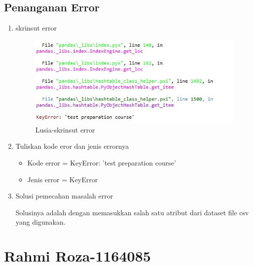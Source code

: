 \subsection{Penanganan Error}
\begin{enumerate}
	\item skrinsut error
		\begin{figure}[ht]
		\centering
		\includegraphics[scale=0.5]{figures/o1.jpg}
		\caption{Lusia-skrinsut error}
		\label{contoh}
		\end{figure}
	\item Tuliskan kode eror dan jenis errornya
		\begin{itemize}
		\item Kode error = KeyError: 'test preparation course'
		\item Jenis error = KeyError
		\end{itemize}
	\item Solusi pemecahan masalah error
		\par Solusinya adalah dengan memasukkan salah satu atribut dari dataset file csv yang digunakan.
\end{enumerate}





\par
\par

\section{Rahmi Roza-1164085}

